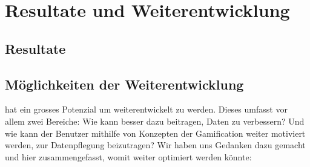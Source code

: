 \chapter{Resultate und Weiterentwicklung}
\label{pd-resultate}

\section{Resultate}

\section{Möglichkeiten der Weiterentwicklung}
\kort{} hat ein grosses Potenzial um weiterentwickelt zu werden.
Dieses umfasst vor allem zwei Bereiche:
Wie kann \kort{} besser dazu beitragen,  Daten zu verbessern?
Und wie kann der Benutzer mithilfe von Konzepten der Gamification weiter motiviert werden, zur Datenpflegung beizutragen?\newline
Wir haben uns Gedanken dazu gemacht und hier zusammengefasst, womit \kort{} weiter optimiert werden könnte:

